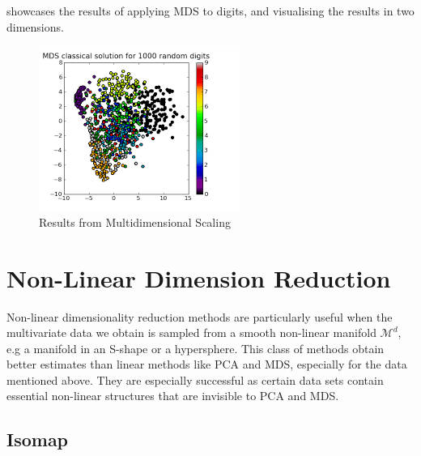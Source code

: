 \documentclass[12pt]{report}
\begin{document}
showcases the results of applying MDS to digits, and visualising the results in 
two dimensions. 
\begin{figure}[ht]
    \begin{center}
        \includegraphics[scale=1]{mds_result.png}
        \caption{Results from Multidimensional Scaling}
        \label{fig:MDS results}
    \end{center}
\end{figure}

\newpage
\section{Non-Linear Dimension Reduction}

Non-linear dimensionality reduction methods are particularly useful 
when the multivariate data we obtain is sampled 
from a smooth non-linear manifold $\mathcal{M}^d$, 
e.g a manifold in an S-shape or a hypersphere.
This class of methods obtain better estimates than linear methods like PCA and MDS,
especially for the data mentioned above. 
They are especially successful as certain data sets contain 
essential non-linear structures that are invisible to PCA and MDS.

\newpage

\subsection{Isomap}
\end{document}
